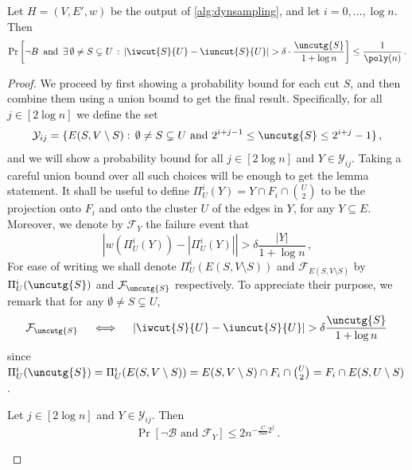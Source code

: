 \begin{lemma} \label{lem:levelbound}
	Let $H=(V,E',w)$ be the output of \cref{alg:dynsampling}, and let $i =0,\dots,\log n$. Then
	\begin{align*}
		\Pr\left[ \neg B\,  \text{ and }\, \exists \, \emptyset \neq S \subsetneq U \, : \,  \left|\iwcut{S}{U} - \iuncut{S}{U}\right| > \delta \cdot \frac{\uncutg{S}}{1+\log n} \right] \le \frac{1}{\poly(n)}
		\, .
	\end{align*}
\end{lemma}
\begin{proof}
We proceed by first showing a probability bound for each cut $S$, and then combine them using a union bound to get the final result. Specifically, for all $j \in [2\log n]$ we define the set
\begin{equation*}
	\mathcal{Y}_{ij}=\{E(S,V \setminus S) : \, \emptyset \neq S \subsetneq U \text{ and } 2^{i+j-1} \le \uncutg{S} \le 2^{i+j}-1 \} \, ,
\end{equation*}
and we will show a probability bound for all $j \in [2\log n]$ and $Y \in \mathcal{Y}_{ij}$. Taking a careful union bound over all such choices will be enough to get the lemma statement. It shall be useful to define $\Pi_U^i(Y)=Y \cap F_i \cap \binom{U}{2}$ to be the projection onto $F_i$ and onto the cluster $U$ of the edges in $Y$, for any $Y \subseteq E$. Moreover, we denote by $\mathcal{F}_{Y}$ the failure event that
\begin{equation*}
	\left|w(\Pi_U^{i}(Y)) - |\Pi_U^{i}(Y)|\right| > \delta \frac{|Y|}{1+\log n} \, ,
\end{equation*}
For ease of writing we shall denote $\Pi_U^i(E(S,V \setminus S))$ and $\mathcal{F}_{E(S,V \setminus S)}$ by $\Pi_U^i(\uncutg{S})$ and $\mathcal{F}_{\uncutg{S}}$ respectively. To appreciate their purpose, we remark that for any $\emptyset \neq S \subsetneq U$,
\begin{align*}
	\mathcal{F}_{\uncutg{S}} \quad \iff \quad \left|\iwcut{S}{U} - \iuncut{S}{U}\right| > \delta \frac{\uncutg{S}}{1+\log n} \, 
\end{align*}
since $\Pi_U^{i}(\uncutg{S})=\Pi_U^{i}(E(S,V \setminus S)) = E(S,V \setminus S) \cap F_i \cap \binom{U}{2} = F_i \cap E(S,U\setminus S)$.

\begin{claim}
	\label{claim:boundprobsingleset}
	Let $j \in [2\log n]$ and $Y \in \mathcal{Y}_{ij}$. Then
	\begin{equation*}
		\Pr[\neg \mathcal{B} \text{ and } \mathcal{F}_Y] \le 2n^{-\frac{C}{768}2^j} \, .
	\end{equation*}
\end{claim}


\end{proof}
